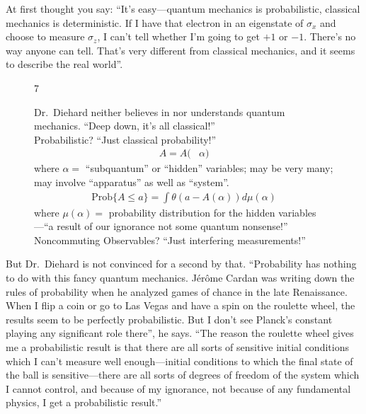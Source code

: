 \documentclass[twocolumn,prb]{revtex4}
\begin{document}
At first thought you say: ``It's easy---quantum mechanics is probabilistic, classical mechanics is deterministic. If I have that electron in an eigenstate of $\sigma_x$ and choose to measure $\sigma_z$, I can't tell whether I'm going to get $+1$ or $-1$. There's no way anyone can tell. That's very different from classical mechanics, and it seems to describe the real world''.
\begin{figure}[htb] 
\begin{mdframed}
  \vspace{5pt}\hfill 7\\ %
  \begin{raggedright}
    Dr.\ Diehard neither believes in nor understands quantum mechanics.  ``Deep down, it's all classical!''\\[\baselineskip]

    Probabilistic?  ``Just classical probability!''
    \begin{align}\nonumber
      A=A(&\alpha) %
    \end{align}
    where $\alpha =$ ``subquantum'' or ``hidden'' variables; 
    may be very many;
    may involve ``apparatus'' as well as ``system''.
    \begin{align}\nonumber
      \text{Prob}\{A\le a\}=\int \theta(a-A(\alpha)) d\mu(\alpha) 
    \end{align}
    where $\mu(\alpha) =$ probability distribution for the hidden variables---``a result of our ignorance not some quantum nonsense!'' \\[\baselineskip]

    Noncommuting Observables?  ``Just interfering measurements!''
  \end{raggedright}
  \vspace{6pt}
\end{mdframed}
\end{figure}

But Dr.\ Diehard is not convinced for a second by that. ``Probability has nothing to do with this fancy quantum mechanics. Jérôme Cardan was writing down the rules of probability when he analyzed games of chance in the late Renaissance. When I flip a coin or go to Las Vegas and have a spin on the roulette wheel, the results seem to be perfectly probabilistic. But I don't see Planck's constant playing any significant role there'', he says. ``The reason the roulette wheel gives me a probabilistic result is that there are all sorts of sensitive initial conditions which I can't measure well enough---initial conditions to which the final state of the ball is sensitive---there are all sorts of degrees of freedom of the system which I cannot control, and because of my ignorance, not because of any fundamental physics, I get a probabilistic
result.''
\end{document}
